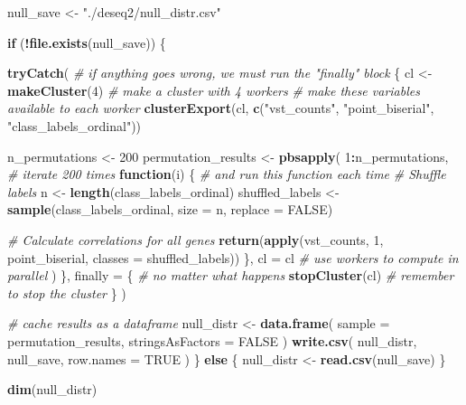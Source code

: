\documentclass[
]{book}
\newenvironment{Shaded}{\begin{snugshade}}{\end{snugshade}}
\newcommand{\AttributeTok}[1]{\textcolor[rgb]{0.13,0.29,0.53}{#1}}
\newcommand{\CommentTok}[1]{\textcolor[rgb]{0.56,0.35,0.01}{\textit{#1}}}
\newcommand{\ConstantTok}[1]{\textcolor[rgb]{0.56,0.35,0.01}{#1}}
\newcommand{\ControlFlowTok}[1]{\textcolor[rgb]{0.13,0.29,0.53}{\textbf{#1}}}
\newcommand{\DecValTok}[1]{\textcolor[rgb]{0.00,0.00,0.81}{#1}}
\newcommand{\FunctionTok}[1]{\textcolor[rgb]{0.13,0.29,0.53}{\textbf{#1}}}
\newcommand{\NormalTok}[1]{#1}
\newcommand{\OtherTok}[1]{\textcolor[rgb]{0.56,0.35,0.01}{#1}}
\newcommand{\SpecialCharTok}[1]{\textcolor[rgb]{0.81,0.36,0.00}{\textbf{#1}}}
\newcommand{\StringTok}[1]{\textcolor[rgb]{0.31,0.60,0.02}{#1}}
\begin{document}
\begin{Shaded}
\begin{Highlighting}[numbers=left,,]
\NormalTok{null\_save }\OtherTok{\textless{}{-}} \StringTok{"./deseq2/null\_distr.csv"}

\ControlFlowTok{if}\NormalTok{ (}\SpecialCharTok{!}\FunctionTok{file.exists}\NormalTok{(null\_save)) \{}

  \FunctionTok{tryCatch}\NormalTok{(             }\CommentTok{\# if anything goes wrong, we must run the "finally" block}
\NormalTok{    \{}
\NormalTok{      cl }\OtherTok{\textless{}{-}} \FunctionTok{makeCluster}\NormalTok{(}\DecValTok{4}\NormalTok{) }\CommentTok{\# make a cluster with 4 workers}
      \CommentTok{\# make these variables available to each worker}
      \FunctionTok{clusterExport}\NormalTok{(cl, }\FunctionTok{c}\NormalTok{(}\StringTok{"vst\_counts"}\NormalTok{, }\StringTok{"point\_biserial"}\NormalTok{, }\StringTok{"class\_labels\_ordinal"}\NormalTok{))}

\NormalTok{      n\_permutations }\OtherTok{\textless{}{-}} \DecValTok{200}
\NormalTok{      permutation\_results }\OtherTok{\textless{}{-}} \FunctionTok{pbsapply}\NormalTok{(}
        \DecValTok{1}\SpecialCharTok{:}\NormalTok{n\_permutations,   }\CommentTok{\# iterate 200 times}
        \ControlFlowTok{function}\NormalTok{(i) \{       }\CommentTok{\# and run this function each time}
          \CommentTok{\# Shuffle labels}
\NormalTok{          n }\OtherTok{\textless{}{-}} \FunctionTok{length}\NormalTok{(class\_labels\_ordinal)}
\NormalTok{          shuffled\_labels }\OtherTok{\textless{}{-}} \FunctionTok{sample}\NormalTok{(class\_labels\_ordinal, }\AttributeTok{size =}\NormalTok{ n, }\AttributeTok{replace =} \ConstantTok{FALSE}\NormalTok{)}

          \CommentTok{\# Calculate correlations for all genes}
          \FunctionTok{return}\NormalTok{(}\FunctionTok{apply}\NormalTok{(vst\_counts, }\DecValTok{1}\NormalTok{, point\_biserial, }\AttributeTok{classes =}\NormalTok{ shuffled\_labels))}
\NormalTok{        \},}
        \AttributeTok{cl =}\NormalTok{ cl }\CommentTok{\# use workers to compute in parallel}
\NormalTok{      )}
\NormalTok{    \},}
    \AttributeTok{finally =}\NormalTok{ \{         }\CommentTok{\# no matter what happens}
      \FunctionTok{stopCluster}\NormalTok{(cl)   }\CommentTok{\# remember to stop the cluster}
\NormalTok{    \}}
\NormalTok{  )}

  \CommentTok{\# cache results as a dataframe}
\NormalTok{  null\_distr }\OtherTok{\textless{}{-}} \FunctionTok{data.frame}\NormalTok{(}
    \AttributeTok{sample =}\NormalTok{ permutation\_results,}
    \AttributeTok{stringsAsFactors =} \ConstantTok{FALSE}
\NormalTok{  )}
  \FunctionTok{write.csv}\NormalTok{(}
\NormalTok{    null\_distr,}
\NormalTok{    null\_save,}
    \AttributeTok{row.names =} \ConstantTok{TRUE}
\NormalTok{  )}
\NormalTok{\} }\ControlFlowTok{else}\NormalTok{ \{}
\NormalTok{  null\_distr }\OtherTok{\textless{}{-}} \FunctionTok{read.csv}\NormalTok{(null\_save)}
\NormalTok{\}}

\FunctionTok{dim}\NormalTok{(null\_distr)}
\end{Highlighting}
\end{Shaded}
\end{document}
